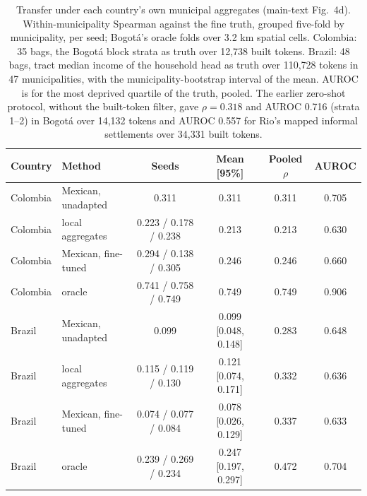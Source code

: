 \documentclass[11pt]{article}
\begin{document}
\begin{table}[h]
\centering
\caption{Transfer under each country's own municipal aggregates (main-text Fig.~4d).
Within-municipality Spearman against the fine truth, grouped five-fold by municipality,
per seed; Bogot\'a's oracle folds over 3.2 km spatial cells. Colombia: 35 bags, the
Bogot\'a block strata as truth over 12{,}738 built tokens. Brazil: 48 bags, tract median
income of the household head as truth over 110{,}728 tokens in 47 municipalities, with
the municipality-bootstrap interval of the mean. AUROC is for the most deprived quartile
of the truth, pooled. The earlier zero-shot protocol, without the built-token filter,
gave $\rho = 0.318$ and AUROC 0.716 (strata 1--2) in Bogot\'a over 14{,}132 tokens and
AUROC 0.557 for Rio's mapped informal settlements over 34{,}331 built tokens.}
\begin{tabular}{llcccc}
\toprule
Country & Method & Seeds & Mean [95\%] & Pooled $\rho$ & AUROC\\
\midrule
Colombia & Mexican, unadapted & 0.311 & 0.311 & 0.311 & 0.705\\
Colombia & local aggregates & 0.223 / 0.178 / 0.238 & 0.213 & 0.213 & 0.630\\
Colombia & Mexican, fine-tuned & 0.294 / 0.138 / 0.305 & 0.246 & 0.246 & 0.660\\
Colombia & oracle & 0.741 / 0.758 / 0.749 & 0.749 & 0.749 & 0.906\\
\midrule
Brazil & Mexican, unadapted & 0.099 & 0.099 [0.048, 0.148] & 0.283 & 0.648\\
Brazil & local aggregates & 0.115 / 0.119 / 0.130 & 0.121 [0.074, 0.171] & 0.332 & 0.636\\
Brazil & Mexican, fine-tuned & 0.074 / 0.077 / 0.084 & 0.078 [0.026, 0.129] & 0.337 & 0.633\\
Brazil & oracle & 0.239 / 0.269 / 0.234 & 0.247 [0.197, 0.297] & 0.472 & 0.704\\
\bottomrule
\end{tabular}
\end{table}
\end{document}
